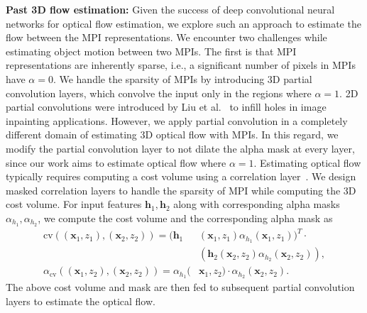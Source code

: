 \documentclass[preprint]{vgtc}
\def\ie{i.e., }
\def\etal{et al.}
\begin{document}
    \textbf{Past 3D flow estimation:}
    Given the success of deep convolutional neural networks for optical flow estimation, we explore such an approach to estimate the flow between the MPI representations.
    We encounter two challenges while estimating object motion between two MPIs.
    The first is that MPI representations are inherently sparse, \ie a significant number of pixels in MPIs have $\alpha=0$.
    We handle the sparsity of MPIs by introducing 3D partial convolution layers, which convolve the input only in the regions where $\alpha=1$.
    2D partial convolutions were introduced by Liu \etal~\cite{liu2018pconv} to infill holes in image inpainting applications.
    However, we apply partial convolution in a completely different domain of estimating 3D optical flow with MPIs.
    In this regard, we modify the partial convolution layer to not dilate the alpha mask at every layer, since our work aims to estimate optical flow where $\alpha=1$.
    Estimating optical flow typically requires computing a cost volume using a correlation layer~\cite{sun2018pwcnet}.
    We design masked correlation layers to handle the sparsity of MPI while computing the 3D cost volume.
    For input features $\mathbf{h}_1, \mathbf{h}_2$ along with corresponding alpha masks $\alpha_{h_1}, \alpha_{h_2}$, we compute the cost volume and the corresponding alpha mask as
    \begin{align}
        \nonumber \text{cv}((\mathbf{x}_1, z_1),(\mathbf{x}_2, z_2)) = (\mathbf{h}_1 &(\mathbf{x}_1, z_1) \alpha_{h_1}(\mathbf{x}_1, z_1))^T \cdot  \\ &(\mathbf{h}_2(\mathbf{x}_2, z_2) \alpha_{h_2}(\mathbf{x}_2, z_2)), \label{eq:masked-correlation}\\
\alpha_{\text{cv}}((\mathbf{x}_1, z_2),(\mathbf{x}_2, z_2)) = \alpha_{h_1}(&\mathbf{x}_1, z_2) \cdot \alpha_{h_2}(\mathbf{x}_2, z_2).  \label{eq:masked-correlation-alpha}
    \end{align}
    The above cost volume and mask are then fed to subsequent partial convolution layers to estimate the optical flow.
\end{document}
